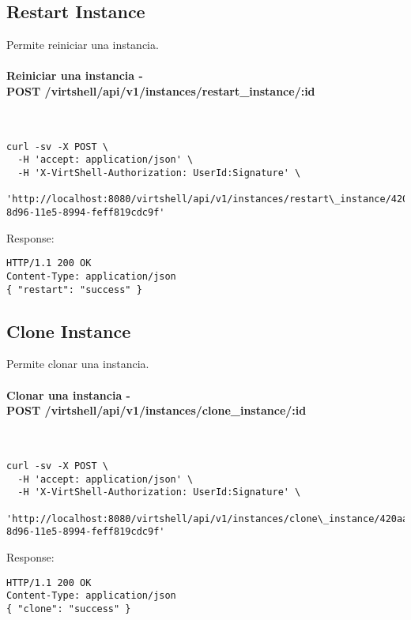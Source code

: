\subsection{Restart Instance}

Permite reiniciar una instancia.

\paragraph{Reiniciar una instancia - \\ POST /virtshell/api/v1/instances/restart\_instance/:id} ~\\

\begin{lstlisting}[style=json]
curl -sv -X POST \
  -H 'accept: application/json' \
  -H 'X-VirtShell-Authorization: UserId:Signature' \
   'http://localhost:8080/virtshell/api/v1/instances/restart\_instance/420aa3f0-8d96-11e5-8994-feff819cdc9f'
\end{lstlisting}

Response:

\begin{lstlisting}[style=json]
HTTP/1.1 200 OK
Content-Type: application/json
{ "restart": "success" }
\end{lstlisting}


\subsection{Clone Instance}

Permite clonar una instancia.

\paragraph{Clonar una instancia - \\ POST /virtshell/api/v1/instances/clone\_instance/:id} ~\\

\begin{lstlisting}[style=json]
curl -sv -X POST \
  -H 'accept: application/json' \
  -H 'X-VirtShell-Authorization: UserId:Signature' \
   'http://localhost:8080/virtshell/api/v1/instances/clone\_instance/420aa3f0-8d96-11e5-8994-feff819cdc9f'
\end{lstlisting}

Response:

\begin{lstlisting}[style=json]
HTTP/1.1 200 OK
Content-Type: application/json
{ "clone": "success" }
\end{lstlisting}

